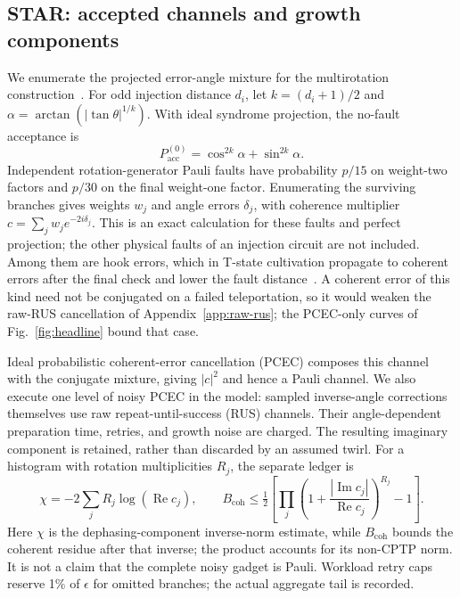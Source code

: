 \documentclass[11pt]{article}
\newcommand{\eps}{\epsilon}
\begin{document}
\subsection{STAR: accepted channels and growth components}
We enumerate the projected error-angle mixture for the multirotation
construction~\cite{toshio}. For odd injection distance $d_i$, let
$k=(d_i+1)/2$ and $\alpha=\arctan(|\tan\theta|^{1/k})$. With ideal
syndrome projection, the no-fault acceptance is
\begin{equation}
 P_{\mathrm{acc}}^{(0)}=\cos^{2k}\alpha+\sin^{2k}\alpha.
\end{equation}
Independent rotation-generator Pauli faults have probability $p/15$ on
weight-two factors and $p/30$ on the final weight-one factor. Enumerating
the surviving branches gives weights $w_j$ and angle errors $\delta_j$,
with coherence multiplier $c=\sum_jw_j e^{-2i\delta_j}$. This is an exact
calculation for these faults and perfect projection; the other physical
faults of an injection circuit are not included. Among them are hook errors,
which in T-state cultivation propagate to coherent errors after the final
check and lower the fault distance~\cite{chan2026hook}. A coherent error of
this kind need not be conjugated on a failed teleportation, so it would
weaken the raw-RUS cancellation of Appendix~\ref{app:raw-rus}; the PCEC-only
curves of Fig.~\ref{fig:headline} bound that case.

Ideal probabilistic coherent-error cancellation (PCEC) composes this
channel with the conjugate mixture, giving $|c|^2$ and hence a Pauli
channel. We also execute one level of noisy PCEC in the model: sampled
inverse-angle corrections themselves use raw repeat-until-success (RUS)
channels. Their angle-dependent preparation time, retries, and growth
noise are charged. The resulting imaginary component is retained,
rather than discarded by an assumed twirl. For a histogram with rotation
multiplicities $R_j$, the separate ledger is
\begin{equation}
 \chi=-2\sum_jR_j\log(\operatorname{Re}c_j),\qquad
 B_{\mathrm{coh}}\leq\tfrac12\left[\prod_j\left(1+\frac{|\operatorname{Im}c_j|}{\operatorname{Re}c_j}\right)^{R_j}-1\right].
\end{equation}
Here $\chi$ is the dephasing-component inverse-norm estimate, while
$B_{\mathrm{coh}}$ bounds the coherent residue after that inverse; the product accounts for
its non-CPTP norm. It is not a
claim that the complete noisy gadget is Pauli. Workload retry caps reserve
1\% of $\eps$ for omitted branches; the actual aggregate tail is recorded.
\end{document}

